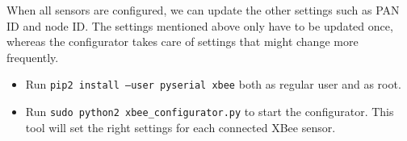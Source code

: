 \documentclass{article}
\begin{document}
When all sensors are configured, we can update the other settings such as PAN ID
and node ID\@. The settings mentioned above only have to be updated once, whereas
the configurator takes care of settings that might change more frequently.

\begin{itemize}
    \item Run {\tt pip2 install --user pyserial xbee} both as regular user and
          as root.
    \item Run {\tt sudo python2 xbee\_configurator.py} to start the configurator.
          This tool will set the right settings for each connected XBee sensor.
\end{itemize}
\end{document}
